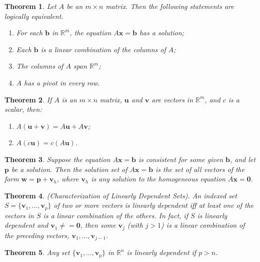 \documentclass{article}
\theoremstyle{plain}
\newtheorem{thm}{Theorem}[section]
\theoremstyle{definition}
\theoremstyle{remark}
\begin{document}
\begin{thm}
    Let $A$ be an $m\times n$ matrix. Then the following statements are logically equivalent.
    \begin{enumerate}
        \item[a.] For each $\textbf{b}$ in $\mathbb{R}^m$, the equation $A\textbf{x}=\textbf{b}$ has a solution;
        \item[b.] Each $\textbf{b}$ is a linear combination of the columns of $A$;
        \item[c.] The columns of $A$ span $\mathbb{R}^m$;
        \item[d.] $A$ has a pivot in every row.
    \end{enumerate}
\end{thm}

\begin{thm}
    If $A$ is an $m\times n$ matrix, $\textbf{u}$ and $\textbf{v}$ are vectors in $\mathbb{R}^m$, and $c$ is a scalar, then:
    \begin{enumerate}
        \item[a.] $A(\textbf{u}+\textbf{v})=A\textbf{u}+A\textbf{v}$;
        \item[b.] $A(c\textbf{u})=c(A\textbf{u})$.
    \end{enumerate}
\end{thm}

\begin{thm}
    Suppose the equation $A\textbf{x}=\textbf{b}$ is consistent for some given $\textbf{b}$, and let $\textbf{p}$ be a solution. Then the solution set of $A\textbf{x}=\textbf{b}$ is the set of all vectors of the form $\textbf{w}=\textbf{p}+\textbf{v}_{h}$, where $\textbf{v}_{h}$ is any solution to the homogeneous equation $A\textbf{x}=\textbf{0}$.
\end{thm}

\begin{thm} (Characterization of Linearly Dependent Sets).
    An indexed set $S=\{\textbf{v}_1,\ldots,\textbf{v}_p\}$ of two or more vectors is linearly dependent iff at least one of the vectors in $S$ is a linear combination of the others. In fact, if $S$ is linearly dependent and $\textbf{v}_1\neq=\textbf{0}$, then some $\textbf{v}_j$ (with $j>1$) is a linear combination of the preceding vectors, $\textbf{v}_1,\ldots,\textbf{v}_{j-1}$.
\end{thm}

\begin{thm}
    Any set $\{\textbf{v}_1,\ldots,\textbf{v}_p\}$ in $\mathbb{R}^n$ is linearly dependent if $p>n$.
\end{thm}
\end{document}
